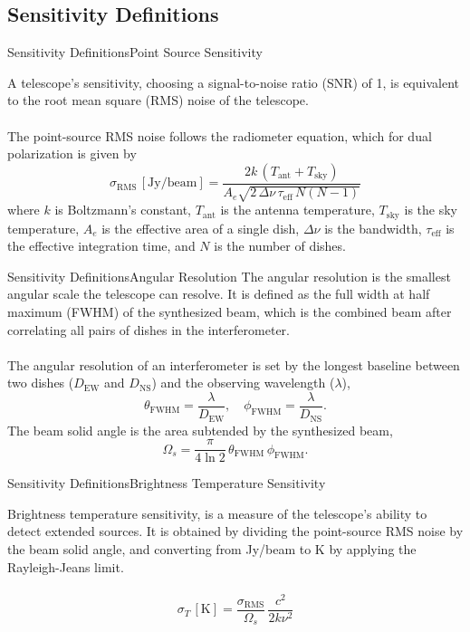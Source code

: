 \documentclass[aspectratio=169]{beamer}
\begin{document}
\subsection{Sensitivity Definitions}
\begin{frame}{Sensitivity Definitions}{Point Source Sensitivity}

  A telescope's sensitivity, choosing a signal-to-noise ratio (SNR) of 1, is equivalent to the root mean square (RMS) noise of the telescope.\\
  ~\\
  The point-source RMS noise follows the radiometer equation, which for dual polarization is given by
  \[
  \sigma_{\mathrm{RMS}}\,[\mathrm{Jy/beam}] = \frac{2k\,(T_{\mathrm{ant}}+T_{\mathrm{sky}})}{A_e\sqrt{2\,\Delta\nu\,\tau_{\mathrm{eff}}\,N(N-1)}}
  \]
  where $k$ is Boltzmann's constant, $T_{\mathrm{ant}}$ is the antenna temperature, $T_{\mathrm{sky}}$ is the sky temperature, $A_e$ is the effective area of a single dish, $\Delta\nu$ is the bandwidth, $\tau_{\mathrm{eff}}$ is the effective integration time, and $N$ is the number of dishes.
\end{frame}

\begin{frame}{Sensitivity Definitions}{Angular Resolution}
  The angular resolution is the smallest angular scale the telescope can resolve. It is defined as the full width at half maximum (FWHM) of the synthesized beam, which is the combined beam after correlating all pairs of dishes in the interferometer.\\
  ~\\
  The angular resolution of an interferometer is set by the longest baseline between two dishes ($D_{\mathrm{EW}}$ and $D_{\mathrm{NS}}$) and the observing wavelength ($\lambda$),
  \[
  \theta_{\mathrm{FWHM}} = \frac{\lambda}{D_{\mathrm{EW}}}, \quad \phi_{\mathrm{FWHM}} = \frac{\lambda}{D_{\mathrm{NS}}}.
  \]
  The beam solid angle is the area subtended by the synthesized beam,
  \[
  \Omega_s = \frac{\pi}{4\ln 2}\,\theta_{\mathrm{FWHM}}\,\phi_{\mathrm{FWHM}}.
  \]
\end{frame}


\begin{frame}{Sensitivity Definitions}{Brightness Temperature Sensitivity}

  Brightness temperature sensitivity, is a measure of the telescope's ability to detect extended sources. It is obtained by dividing the point-source RMS noise by the beam solid angle, and converting from Jy/beam to K by applying the Rayleigh-Jeans limit.\\
  ~\\
  \[
  \sigma_T\,[\mathrm{K}] = \frac{\sigma_{\mathrm{RMS}}}{\Omega_s}\,
\frac{c^2}{2k\nu^2}
  \]
\end{frame}
\end{document}
